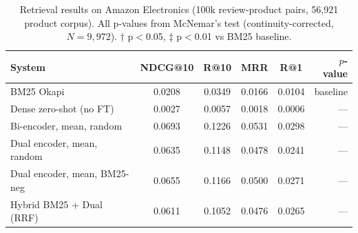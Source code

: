 \begin{table}[t]
\centering
\caption{Retrieval results on Amazon Electronics (100k review-product pairs, 56,921 product corpus). All p-values from McNemar's test (continuity-corrected, $N=9{,}972$). $\dagger$ p$<$0.05, $\ddagger$ p$<$0.01 vs BM25 baseline.}
\label{tab:main_results}
\begin{tabular}{lccccr}
\toprule
System & NDCG@10 & R@10 & MRR & R@1 & $p$-value \\
\midrule
BM25 Okapi & 0.0208 & 0.0349 & 0.0166 & 0.0104 & baseline \\
\midrule
Dense zero-shot (no FT) & 0.0027 & 0.0057 & 0.0018 & 0.0006 & — \\
Bi-encoder, mean, random & 0.0693 & 0.1226 & 0.0531 & 0.0298 & — \\
Dual encoder, mean, random & 0.0635 & 0.1148 & 0.0478 & 0.0241 & — \\
Dual encoder, mean, BM25-neg & 0.0655 & 0.1166 & 0.0500 & 0.0271 & — \\
Hybrid BM25 + Dual (RRF) & 0.0611 & 0.1052 & 0.0476 & 0.0265 & — \\
\bottomrule
\end{tabular}
\end{table}